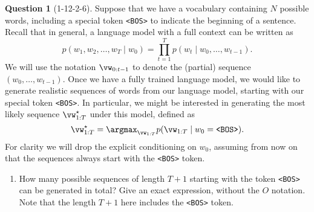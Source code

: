 \documentclass[12pt]{article}
\theoremstyle{definition}
\newtheorem{exercise}{Question}%
\newcommand{\Exercise}[1]{
#1
}
\begin{document}
\begin{exercise}[1-12-2-6]


\def\vdelta{{\bm{\delta}}}
\usetikzlibrary{positioning}

\Exercise{
\label{ex:decoding}
Suppose that we have a vocabulary containing $N$ possible words, including a special token \texttt{<BOS>} to indicate the beginning of a sentence. Recall that in general, a language model with a full context can be written as
\begin{equation*}
    p(w_{1}, w_{2}, \ldots, w_{T} \mid w_{0}) = \prod_{t=1}^{T} p(w_{t} \mid w_{0}, \ldots, w_{t-1}).
\end{equation*}
We will use the notation $\vw_{0:t-1}$ to denote the (partial) sequence $(w_{0}, \ldots, w_{t-1})$. Once we have a fully trained language model, we would like to generate realistic sequences of words from our language model, starting with our special token \texttt{<BOS>}. In particular, we might be interested in generating the most likely sequence $\vw_{1:T}^{\star}$ under this model, defined as
\begin{equation*}
    \vw_{1:T}^{\star} = \argmax_{\vw_{1:T}} p(\vw_{1:T} \mid w_{0} = \textrm{\texttt{<BOS>}}).
\end{equation*}
For clarity we will drop the explicit conditioning on $w_{0}$, assuming from now on that the sequences always start with the \texttt{<BOS>} token.

\begin{enumerate}[label=\arabic{exercise}.\arabic*]
    \item How many possible sequences of length $T+1$ starting with the token \texttt{<BOS>} can be generated in total? Give an exact expression, without the $O$ notation. Note that the length $T+1$ here includes the \texttt{<BOS>} token.
    

\end{enumerate}}
\end{exercise}
\end{document}
